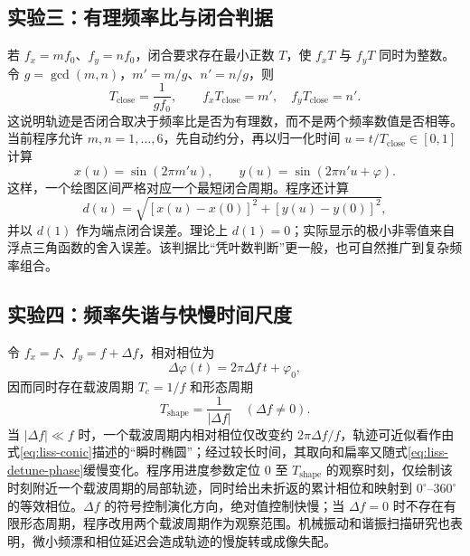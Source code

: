 \documentclass[UTF8,a4paper,zihao=-4]{ctexart}
\begin{document}
\subsection{实验三：有理频率比与闭合判据}
若 $f_x=mf_0$、$f_y=nf_0$，闭合要求存在最小正数 $T$，使 $f_xT$ 与 $f_yT$ 同时为整数。令 $g=\gcd(m,n)$，$m'=m/g$、$n'=n/g$，则
\begin{equation}
 T_{\mathrm{close}}=\frac{1}{g f_0},\qquad
 f_xT_{\mathrm{close}}=m',\quad f_yT_{\mathrm{close}}=n'.
 \label{eq:liss-close}
\end{equation}
这说明轨迹是否闭合取决于频率比是否为有理数，而不是两个频率数值是否相等。当前程序允许 $m,n=1,\ldots,6$，先自动约分，再以归一化时间 $u=t/T_{\mathrm{close}}\in[0,1]$ 计算
\begin{equation}
 x(u)=\sin(2\pi m'u),\qquad
 y(u)=\sin(2\pi n'u+\varphi).
\end{equation}
这样，一个绘图区间严格对应一个最短闭合周期。程序还计算
\begin{equation}
 d(u)=\sqrt{[x(u)-x(0)]^2+[y(u)-y(0)]^2},
\end{equation}
并以 $d(1)$ 作为端点闭合误差。理论上 $d(1)=0$；实际显示的极小非零值来自浮点三角函数的舍入误差。该判据比“凭叶数判断”更一般，也可自然推广到复杂频率组合\cite{doll2007,barna2020}。

\subsection{实验四：频率失谐与快慢时间尺度}
令 $f_x=f$、$f_y=f+\Delta f$，相对相位为
\begin{equation}
 \Delta\varphi(t)=2\pi\Delta f\,t+\varphi_0,
 \label{eq:liss-detune-phase}
\end{equation}
因而同时存在载波周期 $T_c=1/f$ 和形态周期
\begin{equation}
 T_{\mathrm{shape}}=\frac{1}{|\Delta f|}\quad(\Delta f\ne0).
 \label{eq:liss-shape-period}
\end{equation}
当 $|\Delta f|\ll f$ 时，一个载波周期内相对相位仅改变约 $2\pi\Delta f/f$，轨迹可近似看作由式\eqref{eq:liss-conic}描述的“瞬时椭圆”；经过较长时间，其取向和扁率又随式\eqref{eq:liss-detune-phase}缓慢变化。程序用进度参数定位 $0$ 至 $T_{\mathrm{shape}}$ 的观察时刻，仅绘制该时刻附近一个载波周期的局部轨迹，同时给出未折返的累计相位和映射到 $0^\circ$--$360^\circ$ 的等效相位。$\Delta f$ 的符号控制演化方向，绝对值控制快慢；当 $\Delta f=0$ 时不存在有限形态周期，程序改用两个载波周期作为观察范围。机械振动和谐振扫描研究也表明，微小频漂和相位延迟会造成轨迹的慢旋转或成像失配\cite{birla2020,janin2022,denhartog1956}。
\end{document}
